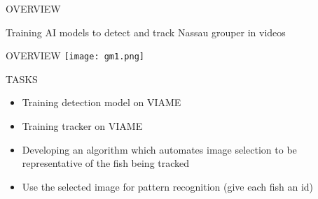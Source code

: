 
\begin{frame}{OVERVIEW}

   Training AI models to detect and track Nassau grouper in videos
\end{frame}


\begin{frame}{OVERVIEW}
    \centering
     \texttt{[image: gm1.png]}
     
\end{frame}

\begin{frame}{TASKS}
    \begin{itemize}
        \item Training detection model on VIAME
        \item Training tracker on VIAME 
        \item Developing an algorithm which automates image selection to be representative of the fish being tracked
        \item Use the selected image for pattern recognition (give each fish an id)
    \end{itemize}
\end{frame}




